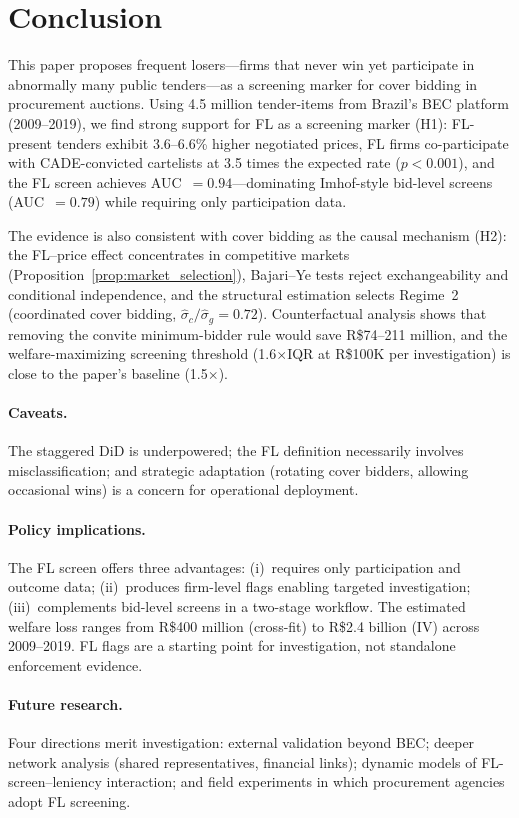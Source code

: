 \section{Conclusion}
\label{sec:conclusion}

This paper proposes frequent losers---firms that never win yet
participate in abnormally many public tenders---as a screening marker for
cover bidding in procurement auctions. Using 4.5 million tender-items
from Brazil's BEC platform (2009--2019), we find strong support for
FL as a screening marker (H1): FL-present tenders exhibit
3.6--6.6\% higher negotiated prices, FL firms co-participate with
CADE-convicted cartelists at 3.5 times the expected rate
($p < 0.001$), and the FL screen achieves AUC~$= 0.94$---dominating
Imhof-style bid-level screens (AUC~$= 0.79$) while requiring only
participation data.

The evidence is also consistent with cover bidding as the causal
mechanism (H2): the FL--price effect concentrates in competitive
markets (Proposition~\ref{prop:market_selection}), Bajari--Ye tests
reject exchangeability and conditional independence, and the
structural estimation selects Regime~2 (coordinated cover bidding,
$\hat{\sigma}_c / \hat{\sigma}_g = 0.72$). Counterfactual analysis
shows that removing the convite minimum-bidder rule would save
R\$74--211 million, and the welfare-maximizing screening threshold
(1.6$\times$IQR at R\$100K per investigation) is close to the
paper's baseline (1.5$\times$).

\paragraph{Caveats.}
The staggered DiD is underpowered; the FL definition necessarily
involves misclassification; and strategic adaptation (rotating cover
bidders, allowing occasional wins) is a concern for operational
deployment.

\paragraph{Policy implications.}
The FL screen offers three advantages: (i)~requires only participation
and outcome data; (ii)~produces firm-level flags enabling targeted
investigation; (iii)~complements bid-level screens in a two-stage
workflow. The estimated welfare loss ranges from R\$400 million
(cross-fit) to R\$2.4 billion (IV) across 2009--2019. FL flags are
a starting point for investigation, not standalone enforcement evidence.

\paragraph{Future research.}
Four directions merit investigation: external validation beyond BEC;
deeper network analysis (shared representatives, financial links);
dynamic models of FL-screen--leniency interaction; and field
experiments in which procurement agencies adopt FL screening.
